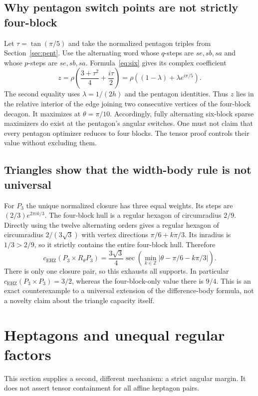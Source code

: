 \documentclass[11pt,a4paper]{article}
\theoremstyle{definition}\newtheorem{definition}[theorem]{Definition}
\theoremstyle{remark}\newtheorem{remark}[theorem]{Remark}
\newcommand{\capc}{c_{\mathrm{EHZ}}}
\begin{document}
\subsection{Why pentagon switch points are not strictly four-block}
Let $\tau=\tan(\pi/5)$ and take the normalized pentagon triples from Section~\ref{sec:pent}. Use the alternating word whose $q$-steps are $se,sb,sa$ and whose $p$-steps are $se,sb,sa$. Formula~\eqref{eq:six} gives its complex coefficient
\[
 z=\rho\left(\frac{3+\tau^2}{4}+\frac{i\tau}{2}\right)
   =\rho\left((1-\lambda)+\lambda e^{i\pi/5}\right).
\]
The second equality uses $\lambda=1/(2h)$ and the pentagon identities. Thus $z$ lies in the relative interior of the edge joining two consecutive vertices of the four-block decagon. It maximizes at $\theta=\pi/10$. Accordingly, fully alternating six-block sparse maximizers do exist at the pentagon's angular switches. One must not claim that every pentagon optimizer reduces to four blocks. The tensor proof controls their value without excluding them.

\subsection{Triangles show that the width-body rule is not universal}
For $P_3$ the unique normalized closure has three equal weights. Its steps are $(2/3)e^{2\pi i k/3}$. The four-block hull is a regular hexagon of circumradius $2/9$. Directly using the twelve alternating orders gives a regular hexagon of circumradius $2/(3\sqrt3)$ with vertex directions $\pi/6+k\pi/3$. Its inradius is $1/3>2/9$, so it strictly contains the entire four-block hull. Therefore
\begin{equation}\label{eq:triangle}
 \boxed{\displaystyle
 \capc(P_3\times R_\theta P_3)
 =\frac{3\sqrt3}{4}\sec\left(\min_{k\in\mathbb Z}|\theta-\pi/6-k\pi/3|\right).}
\end{equation}
There is only one closure pair, so this exhausts all supports. In particular $\capc(P_3\times P_3)=3/2$, whereas the four-block-only value there is $9/4$. This is an exact counterexample to a universal extension of the difference-body formula, not a novelty claim about the triangle capacity itself.

\section{Heptagons and unequal regular factors}\label{sec:hept}
This section supplies a second, different mechanism: a strict angular margin. It does not assert tensor containment for all affine heptagon pairs.
\end{document}
